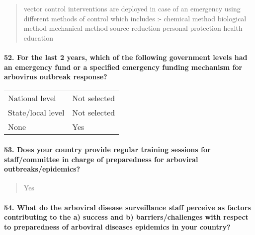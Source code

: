 \documentclass[
]{article}
\begin{document}
\begin{quote}
vector control interventions are deployed in case of an emergency using
different methods of control which includes :- chemical method
biological method mechanical method source reduction personal protection
health education
\end{quote}

\hypertarget{for-the-last-2-years-which-of-the-following-government-levels-had-an-emergency-fund-or-a-specified-emergency-funding-mechanism-for-arbovirus-outbreak-response}{%
\paragraph{52. For the last 2 years, which of the following government
levels had an emergency fund or a specified emergency funding mechanism
for arbovirus outbreak
response?}\label{for-the-last-2-years-which-of-the-following-government-levels-had-an-emergency-fund-or-a-specified-emergency-funding-mechanism-for-arbovirus-outbreak-response}}

\begin{longtable}[]{@{}ll@{}}
\toprule
\endhead
National level & Not selected \\
State/local level & Not selected \\
None & Yes \\
\bottomrule
\end{longtable}

\hypertarget{does-your-country-provide-regular-training-sessions-for-staffcommittee-in-charge-of-preparedness-for-arboviral-outbreaksepidemics}{%
\paragraph{53. Does your country provide regular training sessions for
staff/committee in charge of preparedness for arboviral
outbreaks/epidemics?}\label{does-your-country-provide-regular-training-sessions-for-staffcommittee-in-charge-of-preparedness-for-arboviral-outbreaksepidemics}}

\begin{quote}
Yes
\end{quote}

\hypertarget{what-do-the-arboviral-disease-surveillance-staff-perceive-as-factors-contributing-to-the-a-success-and-b-barrierschallenges-with-respect-to-preparedness-of-arboviral-diseases-epidemics-in-your-country}{%
\paragraph{54. What do the arboviral disease surveillance staff perceive
as factors contributing to the a) success and b) barriers/challenges
with respect to preparedness of arboviral diseases epidemics in your
country?}\label{what-do-the-arboviral-disease-surveillance-staff-perceive-as-factors-contributing-to-the-a-success-and-b-barrierschallenges-with-respect-to-preparedness-of-arboviral-diseases-epidemics-in-your-country}}
\end{document}
